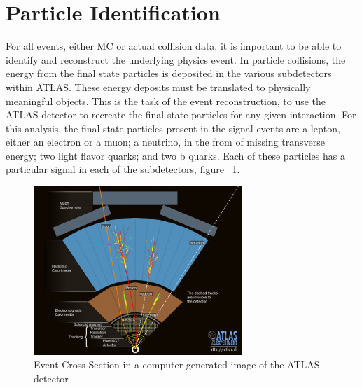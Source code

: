 \section{Particle Identification}
For all events, either MC or actual collision data, it is important to be able to identify and reconstruct the underlying physics event. In particle collisions, the energy from the final state particles is deposited in the various subdetectors within ATLAS. These energy deposits must be translated to physically meaningful objects. This is the task of the event reconstruction, to use the ATLAS detector to recreate the final state particles for any given interaction. For this analysis, the final state particles present in the signal events are a lepton, either an electron or a muon; a neutrino, in the from of missing transverse energy; two light flavor quarks; and two b quarks. Each of these particles has a particular signal in each of the subdetectors, figure ~\ref{fig:crossSec}.

\begin{figure}[h]
\begin{center}
\includegraphics*[width=0.70\textwidth] {figures/layers}
\caption[Cartoon showing particle interating in ATLAS detector subsystems]{Event Cross Section in a computer generated image of the ATLAS detector \cite{Pequenao:1096081}}
\label{fig:crossSec}
\end{center}
\end{figure}


